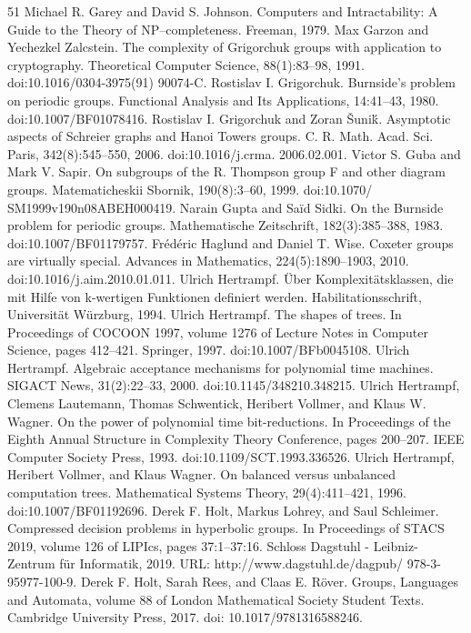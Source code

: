 \documentclass[10pt,a4paper]{article}
\begin{document}
\begin{thebibliography}{51}
 Michael R. Garey and David S. Johnson. Computers and Intractability: A Guide to the Theory of NP–completeness. Freeman, 1979.
 Max Garzon and Yechezkel Zalcstein. The complexity of Grigorchuk groups with application to cryptography. Theoretical Computer Science, 88(1):83–98, 1991. doi:10.1016/0304-3975(91) 90074-C.
 Rostislav I. Grigorchuk. Burnside’s problem on periodic groups. Functional Analysis and Its Applications, 14:41–43, 1980. doi:10.1007/BF01078416.
 Rostislav I. Grigorchuk and Zoran Šuniḱ. Asymptotic aspects of Schreier graphs and Hanoi Towers groups. C. R. Math. Acad. Sci. Paris, 342(8):545–550, 2006. doi:10.1016/j.crma. 2006.02.001.
 Victor S. Guba and Mark V. Sapir. On subgroups of the R. Thompson group F and other diagram groups. Matematicheskii Sbornik, 190(8):3–60, 1999. doi:10.1070/ SM1999v190n08ABEH000419.
 Narain Gupta and Saïd Sidki. On the Burnside problem for periodic groups. Mathematische Zeitschrift, 182(3):385–388, 1983. doi:10.1007/BF01179757.
 Frédéric Haglund and Daniel T. Wise. Coxeter groups are virtually special. Advances in Mathematics, 224(5):1890–1903, 2010. doi:10.1016/j.aim.2010.01.011.
 Ulrich Hertrampf. Über Komplexitätsklassen, die mit Hilfe von k-wertigen Funktionen definiert werden. Habilitationsschrift, Universität Würzburg, 1994.
 Ulrich Hertrampf. The shapes of trees. In Proceedings of COCOON 1997, volume 1276 of Lecture Notes in Computer Science, pages 412–421. Springer, 1997. doi:10.1007/BFb0045108.
 Ulrich Hertrampf. Algebraic acceptance mechanisms for polynomial time machines. SIGACT News, 31(2):22–33, 2000. doi:10.1145/348210.348215.
 Ulrich Hertrampf, Clemens Lautemann, Thomas Schwentick, Heribert Vollmer, and Klaus W. Wagner. On the power of polynomial time bit-reductions. In Proceedings of the Eighth Annual Structure in Complexity Theory Conference, pages 200–207. IEEE Computer Society Press, 1993. doi:10.1109/SCT.1993.336526.
 Ulrich Hertrampf, Heribert Vollmer, and Klaus Wagner. On balanced versus unbalanced computation trees. Mathematical Systems Theory, 29(4):411–421, 1996. doi:10.1007/BF01192696.
 Derek F. Holt, Markus Lohrey, and Saul Schleimer. Compressed decision problems in hyperbolic groups. In Proceedings of STACS 2019, volume 126 of LIPIcs, pages 37:1–37:16. Schloss Dagstuhl - Leibniz-Zentrum für Informatik, 2019. URL: http://www.dagstuhl.de/dagpub/ 978-3-95977-100-9.
 Derek F. Holt, Sarah Rees, and Claas E. Röver. Groups, Languages and Automata, volume 88 of London Mathematical Society Student Texts. Cambridge University Press, 2017. doi: 10.1017/9781316588246.

\end{thebibliography}
\end{document}
